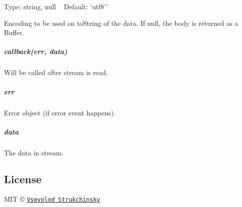 Type\+: {\ttfamily string}, {\ttfamily null} ~\newline
Default\+: `\textquotesingle{}utf8'\`{}

Encoding to be used on {\ttfamily to\+String} of the data. If null, the body is returned as a Buffer.

\subparagraph*{callback(err, data)}

Will be called after stream is read.

\subparagraph*{err}

{\ttfamily Error} object (if {\ttfamily error} event happens).

\subparagraph*{data}

The data in stream.

\subsection*{License}

M\+IT © \href{floatdrop@gmail.com}{\tt Vsevolod Strukchinsky} 